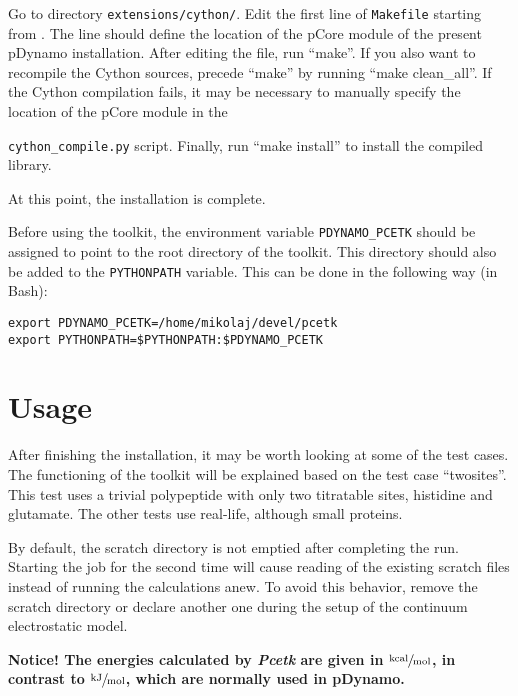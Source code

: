 \documentclass[12pt]{article}
\newcommand{\modulename}{\textit{Pcetk}\xspace}
\newcommand{\kcal}{$\sfrac{\rm kcal}{\rm mol}$\xspace}
\newcommand{\kjoule}{$\sfrac{\rm kJ}{\rm mol}$\xspace}
\begin{document}
\bigskip
Go to directory \texttt{extensions/cython/}.
%
Edit the first line of \texttt{Makefile} starting from .
%
The line should define the location of the pCore module of the present pDynamo installation.
%
After editing the file, run ``make''.
%
If you also want to recompile the Cython sources, precede ``make'' by running ``make clean\_all''.
%
If the Cython compilation fails,
it may be necessary to manually specify the location of the pCore module in
the {\texttt{cython\_compile.py} script.
%
Finally,
run ``make install'' to install the compiled library.

\bigskip
At this point, the installation is complete.

\bigskip
Before using the toolkit,
the environment variable \texttt{PDYNAMO\_PCETK}
should be assigned to point to the root directory of the toolkit.
%
This directory should also be added to the \texttt{PYTHONPATH} variable.
%
This can be done in the following way (in Bash):

{\footnotesize \singlespacing \begin{lstlisting}
export PDYNAMO_PCETK=/home/mikolaj/devel/pcetk
export PYTHONPATH=$PYTHONPATH:$PDYNAMO_PCETK
\end{lstlisting} }


\section{Usage}
After finishing the installation,
it may be worth looking at some of the test cases.
%
The functioning of the toolkit will be explained based on
the test case ``twosites''.
%
This test uses a trivial polypeptide with only two titratable sites,
histidine and glutamate.
%
The other tests use real-life,
although small proteins.


By default,
the scratch directory is not emptied after completing the run.
%
Starting the job for the second time will cause reading of the existing
scratch files instead of running the calculations anew.
%
To avoid this behavior,
remove the scratch directory or declare another one
during the setup of the continuum electrostatic model.

\textbf{Notice! The energies calculated by \modulename are
given in \kcal, in contrast to \kjoule, which are normally used
in pDynamo.}


}
\end{document}
